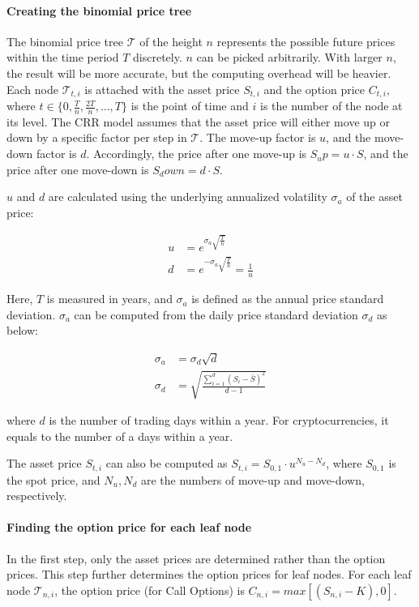\paragraph{Creating the binomial price tree}
The binomial price tree $\mathcal{T}$ of the height $n$ represents the possible future prices within the time period $T$ discretely.
$n$ can be picked arbitrarily. With larger $n$, the result will be more accurate, but the computing overhead will be heavier.
Each node $\mathcal{T}_{t, i}$ is attached with the asset price $S_{t, i}$ and the option price $C_{t, i}$,
where $t \in \{0, \frac{T}{n}, \frac{2T}{n}, \dots, T\}$ is the point of time and $i$ is the number of the node at its level.
The CRR model assumes that the asset price will either move up or down by a specific factor per step in $\mathcal{T}$.
The move-up factor is $u$, and the move-down factor is $d$.
Accordingly, the price after one move-up is $S_up = u \cdot S$, and the price after one move-down is $S_down = d \cdot S$.

$u$ and $d$ are calculated using the underlying annualized volatility $\sigma_a$ of the asset price:

\begin{align} 
u &= e^{\sigma_a \sqrt{\frac{T}{n}}}\\
d &= e^{- \sigma_a \sqrt{\frac{T}{n}}} = \frac{1}{u}
\end{align}

Here, $T$ is measured in years, and $\sigma_a$ is defined as the annual price standard deviation.
$\sigma_a$ can be computed from the daily price standard deviation $\sigma_d$ as below:

\begin{align} 
\sigma_a &= \sigma_d \sqrt{d}\\
\sigma_d &= \sqrt{\frac{\sum^{d}_{i=1} (S_i - \bar{S})^2}{d-1}}
\end{align}

where $d$ is the number of trading days within a year.
For cryptocurrencies, it equals to the number of a days within a year.

The asset price $S_{t, i}$ can also be computed as $S_{t, i} = S_{0, 1} \cdot u^{N_u - N_d}$, where $S_{0, 1}$ is the spot price, and $N_u, N_d$ are the numbers of move-up and move-down, respectively.

\paragraph{Finding the option price for each leaf node}
In the first step, only the asset prices are determined rather than the option prices.
This step further determines the option prices for leaf nodes.
For each leaf node $\mathcal{T}_{n, i}$, the option price (for Call Options) is $C_{n, i} = max[(S_{n, i} - K), 0]$.


